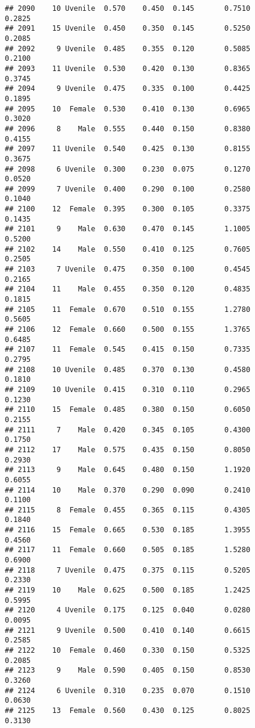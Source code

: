 \documentclass[
]{article}
\begin{document}
\begin{verbatim}
## 2090    10 Uvenile  0.570    0.450  0.145       0.7510         0.2825
## 2091    15 Uvenile  0.450    0.350  0.145       0.5250         0.2085
## 2092     9 Uvenile  0.485    0.355  0.120       0.5085         0.2100
## 2093    11 Uvenile  0.530    0.420  0.130       0.8365         0.3745
## 2094     9 Uvenile  0.475    0.335  0.100       0.4425         0.1895
## 2095    10  Female  0.530    0.410  0.130       0.6965         0.3020
## 2096     8    Male  0.555    0.440  0.150       0.8380         0.4155
## 2097    11 Uvenile  0.540    0.425  0.130       0.8155         0.3675
## 2098     6 Uvenile  0.300    0.230  0.075       0.1270         0.0520
## 2099     7 Uvenile  0.400    0.290  0.100       0.2580         0.1040
## 2100    12  Female  0.395    0.300  0.105       0.3375         0.1435
## 2101     9    Male  0.630    0.470  0.145       1.1005         0.5200
## 2102    14    Male  0.550    0.410  0.125       0.7605         0.2505
## 2103     7 Uvenile  0.475    0.350  0.100       0.4545         0.2165
## 2104    11    Male  0.455    0.350  0.120       0.4835         0.1815
## 2105    11  Female  0.670    0.510  0.155       1.2780         0.5605
## 2106    12  Female  0.660    0.500  0.155       1.3765         0.6485
## 2107    11  Female  0.545    0.415  0.150       0.7335         0.2795
## 2108    10 Uvenile  0.485    0.370  0.130       0.4580         0.1810
## 2109    10 Uvenile  0.415    0.310  0.110       0.2965         0.1230
## 2110    15  Female  0.485    0.380  0.150       0.6050         0.2155
## 2111     7    Male  0.420    0.345  0.105       0.4300         0.1750
## 2112    17    Male  0.575    0.435  0.150       0.8050         0.2930
## 2113     9    Male  0.645    0.480  0.150       1.1920         0.6055
## 2114    10    Male  0.370    0.290  0.090       0.2410         0.1100
## 2115     8  Female  0.455    0.365  0.115       0.4305         0.1840
## 2116    15  Female  0.665    0.530  0.185       1.3955         0.4560
## 2117    11  Female  0.660    0.505  0.185       1.5280         0.6900
## 2118     7 Uvenile  0.475    0.375  0.115       0.5205         0.2330
## 2119    10    Male  0.625    0.500  0.185       1.2425         0.5995
## 2120     4 Uvenile  0.175    0.125  0.040       0.0280         0.0095
## 2121     9 Uvenile  0.500    0.410  0.140       0.6615         0.2585
## 2122    10  Female  0.460    0.330  0.150       0.5325         0.2085
## 2123     9    Male  0.590    0.405  0.150       0.8530         0.3260
## 2124     6 Uvenile  0.310    0.235  0.070       0.1510         0.0630
## 2125    13  Female  0.560    0.430  0.125       0.8025         0.3130

\end{verbatim}
\end{document}
